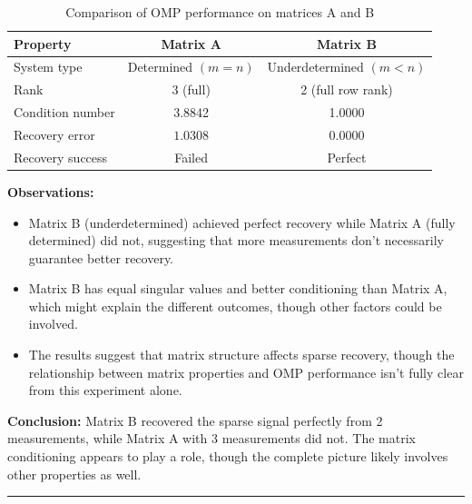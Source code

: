 \begin{table}[h]
\centering
\begin{tabular}{lcc}
\toprule
Property & Matrix A & Matrix B \\
\midrule
System type & Determined $(m=n)$ & Underdetermined $(m<n)$ \\
Rank & 3 (full) & 2 (full row rank) \\
Condition number & 3.8842 & 1.0000 \\
Recovery error & $1.0308$ & $0.0000$ \\
Recovery success & Failed & Perfect \\
\bottomrule
\end{tabular}
\caption{Comparison of OMP performance on matrices A and B}
\end{table}

\textbf{Observations:}

\begin{itemize}
    \item Matrix B (underdetermined) achieved perfect recovery while Matrix A (fully determined) did not, suggesting that more measurements don't necessarily guarantee better recovery.
    
    \item Matrix B has equal singular values and better conditioning than Matrix A, which might explain the different outcomes, though other factors could be involved.
    
    \item The results suggest that matrix structure affects sparse recovery, though the relationship between matrix properties and OMP performance isn't fully clear from this experiment alone.
\end{itemize}

\textbf{Conclusion:} Matrix B recovered the sparse signal perfectly from 2 measurements, while Matrix A with 3 measurements did not. The matrix conditioning appears to play a role, though the complete picture likely involves other properties as well.

\vspace{2em}
\noindent\rule{\textwidth}{0.4pt}
